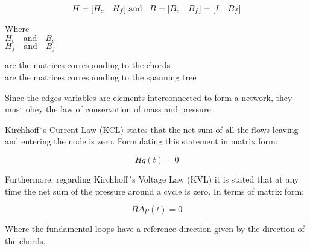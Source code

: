 \begin{equation}
H = [H_c \quad H_f]
\hspace{0.1cm} \text{and}\hspace{0.3cm}
B = [B_c  \quad B_f] = [I \quad B_f]
\label{HandB}
\end{equation}

\begin{minipage}[t]{0.20\textwidth}
Where\\
\hspace*{8mm} $H_c \quad \text{and} \quad B_c$ \\
\hspace*{8mm} $H_f \quad \text{and} \quad B_f$ 
\end{minipage}
\begin{minipage}[t]{0.68\textwidth}
\vspace*{2mm}
\hspace*{8mm} are the matrices corresponding to the chords\\
\hspace*{8mm} are the matrices corresponding to the spanning tree 
\end{minipage}

Since the edges variables are elements interconnected to form a network, 
they must obey the law of conservation of mass and pressure \cite{GraphModel}. 

Kirchhoff´s Current Law (KCL) states that the net sum of all the flows leaving and entering the node is zero. Formulating this statement in matrix form:

\begin{equation}
  \label{KCL}
  Hq(t) = 0
\end{equation}

Furthermore, regarding Kirchhoff´s Voltage Law (KVL) it is stated that at any time the net sum of the pressure around a cycle 
is zero. In terms of matrix form:

\begin{equation}
 \label{KVL} 
 B\Delta p (t) = 0
\end{equation}

Where the fundamental loops have a reference direction given by the direction of the 
chords. 





 